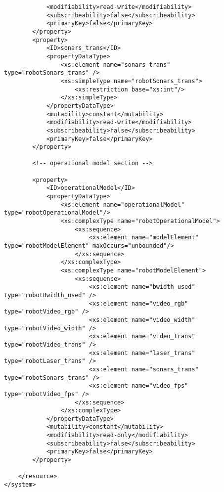 \documentclass{aslreport}
\begin{document}
{\begin{verbatim}
            <modifiability>read-write</modifiability>
            <subscribeability>false</subscribeability>
            <primaryKey>false</primaryKey>
        </property>
        <property>
            <ID>sonars_trans</ID>
            <propertyDataType>
                <xs:element name="sonars_trans" type="robotSonars_trans" />
                <xs:simpleType name="robotSonars_trans">
                    <xs:restriction base="xs:int"/>
                </xs:simpleType>
            </propertyDataType>
            <mutability>constant</mutability>
            <modifiability>read-write</modifiability>
            <subscribeability>false</subscribeability>
            <primaryKey>false</primaryKey>
        </property>

		<!-- operational model section -->
		
		<property>
			<ID>operationalModel</ID>
			<propertyDataType>
				<xs:element name="operationalModel" type="robotOperationalModel"/>
				<xs:complexType name="robotOperationalModel">
					<xs:sequence>
						<xs:element name="modelElement" type="robotModelElement" maxOccurs="unbounded"/>
					</xs:sequence>
				</xs:complexType>
				<xs:complexType name="robotModelElement">
					<xs:sequence>
						<xs:element name="bwidth_used" type="robotBwidth_used" />
						<xs:element name="video_rgb" type="robotVideo_rgb" />
						<xs:element name="video_width" type="robotVideo_width" />
						<xs:element name="video_trans" type="robotVideo_trans" />
						<xs:element name="laser_trans" type="robotLaser_trans" />
						<xs:element name="sonars_trans" type="robotSonars_trans" />
						<xs:element name="video_fps" type="robotVideo_fps" />
					</xs:sequence>
				</xs:complexType>
			</propertyDataType>
			<mutability>constant</mutability>
			<modifiability>read-only</modifiability>
			<subscribeability>false</subscribeability>
			<primaryKey>false</primaryKey>
		</property>

	</resource>
</system>

\end{verbatim}
}






\finalcover
\end{document}
